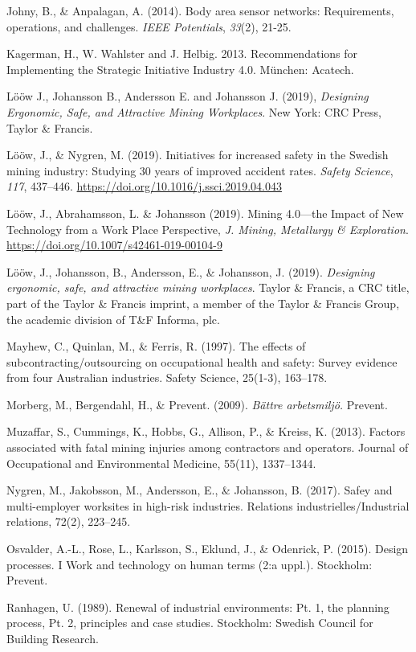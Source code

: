 \documentclass[
  12pt,
]{scrbook}
\begin{document}
Johny, B., \& Anpalagan, A. (2014). Body area sensor networks:
Requirements, operations, and challenges. \emph{IEEE Potentials}, \emph{33}(2),
21-25.

Kagerman, H., W. Wahlster and J. Helbig. 2013. Recommendations for
Implementing the Strategic Initiative Industry 4.0. München: Acatech.

Lööw J., Johansson B., Andersson E. and Johansson J. (2019), \emph{Designing
Ergonomic, Safe, and Attractive Mining Workplaces}. New York: CRC Press,
Taylor \& Francis.

Lööw, J., \& Nygren, M. (2019). Initiatives for increased safety in the
Swedish mining industry: Studying 30 years of improved accident rates.
\emph{Safety Science}, \emph{117}, 437--446.
\url{https://doi.org/10.1016/j.ssci.2019.04.043}

Lööw, J., Abrahamsson, L. \& Johansson (2019). Mining 4.0---the Impact of
New Technology from a Work Place Perspective, \emph{J. Mining, Metallurgy \&
Exploration}. \url{https://doi.org/10.1007/s42461-019-00104-9}

Lööw, J., Johansson, B., Andersson, E., \& Johansson, J. (2019).
\emph{Designing ergonomic, safe, and attractive mining workplaces}. Taylor \&
Francis, a CRC title, part of the Taylor \& Francis imprint, a member of
the Taylor \& Francis Group, the academic division of T\&F Informa, plc.

Mayhew, C., Quinlan, M., \& Ferris, R. (1997). The effects of
subcontracting/outsourcing on occupational health and safety: Survey
evidence from four Australian industries. Safety Science, 25(1-3),
163--178.

Morberg, M., Bergendahl, H., \& Prevent. (2009). \emph{Bättre arbetsmiljö.}
Prevent.

Muzaffar, S., Cummings, K., Hobbs, G., Allison, P., \& Kreiss, K. (2013).
Factors associated with fatal mining injuries among contractors and
operators. Journal of Occupational and Environmental Medicine, 55(11),
1337--1344.

Nygren, M., Jakobsson, M., Andersson, E., \& Johansson, B. (2017). Safey
and multi-employer worksites in high-risk industries. Relations
industrielles/Industrial relations, 72(2), 223--245.

Osvalder, A.-L., Rose, L., Karlsson, S., Eklund, J., \& Odenrick, P.
(2015). Design processes. I Work and technology on human terms (2:a
uppl.). Stockholm: Prevent.

Ranhagen, U. (1989). Renewal of industrial environments: Pt. 1, the
planning process, Pt. 2, principles and case studies. Stockholm: Swedish
Council for Building Research.
\end{document}
